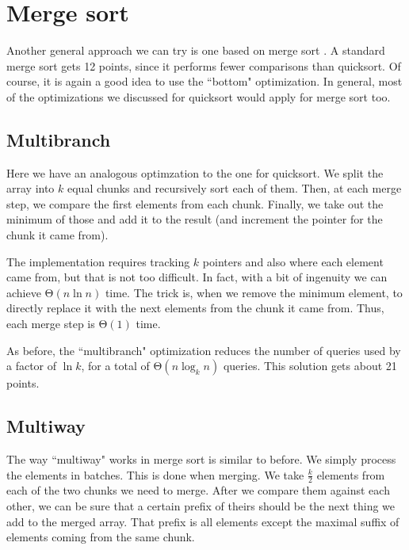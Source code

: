 \documentclass{article}
\begin{document}
\section{Merge sort}

Another general approach we can try is one based on merge sort \cite{mergesort}. A standard merge sort gets 12 points, since it performs fewer comparisons than quicksort. Of course, it is again a good idea to use the ``bottom" optimization. In general, most of the optimizations we discussed for quicksort would apply for merge sort too.

\subsection{Multibranch}

Here we have an analogous optimzation to the one for quicksort. We split the array into $k$ equal chunks and recursively sort each of them. Then, at each merge step, we compare the first elements from each chunk. Finally, we take out the minimum of those and add it to the result (and increment the pointer for the chunk it came from).

The implementation requires tracking $k$ pointers and also where each element came from, but that is not too difficult. In fact, with a bit of ingenuity we can achieve $ \mathrm{\Theta}\left( n \ln{n} \right) $ time. The trick is, when we remove the minimum element, to directly replace it with the next elements from the chunk it came from. Thus, each merge step is $  \mathrm{\Theta}\left( 1 \right) $  time.

As before, the ``multibranch" optimization reduces the number of queries used by a factor of $ \ln{k} $, for a total of $ \mathrm{\Theta}\left( n \log_k{n} \right) $ queries. This solution gets about 21 points.

\subsection{Multiway}

The way ``multiway" works in merge sort is similar to before. We simply process the elements in batches. This is done when merging. We take $ \frac{k}{2} $ elements from each of the two chunks we need to merge. After we compare them against each other, we can be sure that a certain prefix of theirs should be the next thing we add to the merged array. That prefix is all elements except the maximal suffix of elements coming from the same chunk.
\end{document}
